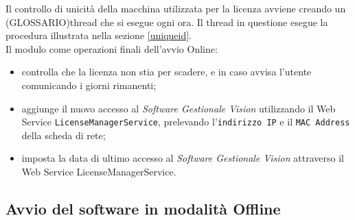 Il controllo di unicità della macchina utilizzata per la licenza avviene creando un (GLOSSARIO)thread che si esegue ogni ora. Il thread in questione esegue la procedura illustrata nella sezione \ref{uniqueid}.\\

Il modulo come operazioni finali dell’avvio Online: 
\begin{itemize}

\item controlla che la licenza non stia per scadere, e in caso avvisa l’utente comunicando i giorni rimanenti;
\item aggiunge il nuovo accesso al \textit{Software Gestionale Vision} utilizzando il Web Service \texttt{LicenseManagerService}, prelevando l'\texttt{indirizzo IP} e il \texttt{MAC Address} della scheda di rete;
\item imposta la data di ultimo accesso al \textit{Software Gestionale Vision} attraverso il Web Service LicenseManagerService.

\end{itemize}

\subsection{Avvio del software in modalità Offline}
\label{off}

